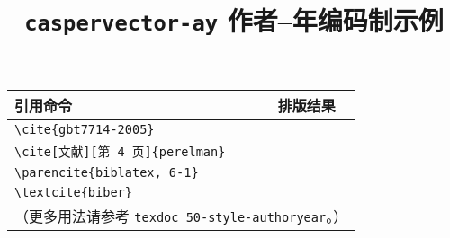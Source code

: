 \documentclass[UTF8]{ctexart}
\begin{document}
\title{\textbf{\texttt{caspervector-ay} 作者--年编码制示例}}
\author{}
\date{}
\maketitle
\vspace*{-1em}

\begin{center}
\begin{tabular}{ll}
\hline
引用命令 &	排版结果 \\\hline
\verb|\cite{gbt7714-2005}| &	\cite{gbt7714-2005} \\
\verb|\cite[文献][第 4 页]{perelman}| &	\cite[文献][第 4 页]{perelman} \\
\verb|\parencite{biblatex, 6-1}| &	\parencite{biblatex, 6-1} \\
\verb|\textcite{biber}| &	\textcite{biber} \\\hline
\multicolumn{2}{l}{（更多用法请参考 \texttt{texdoc 50-style-authoryear}。）} \\
\end{tabular}
\end{center}
\vspace*{1em}

\printbibliography
\nocite{*}
\end{document}
